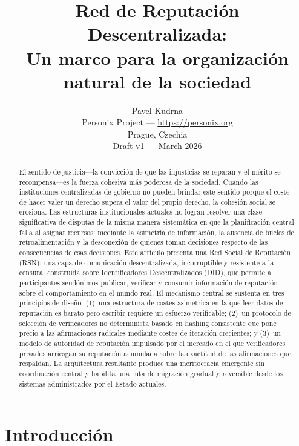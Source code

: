 \documentclass[11pt,a4paper,twocolumn]{article}
\title{\textbf{Red de Reputación Descentralizada:\\Un marco para la organización natural de la sociedad}}
\author{Pavel Kudrna\\Personix Project --- \url{https://personix.org}\\Prague, Czechia\\Draft v1 --- March 2026}
\date{}
\begin{document}
\maketitle

\begin{abstract}
El sentido de justicia---la convicción de que las injusticias se reparan y el mérito se recompensa---es la fuerza cohesiva más poderosa de la sociedad. Cuando las instituciones centralizadas de gobierno no pueden brindar este sentido porque el coste de hacer valer un derecho supera el valor del propio derecho, la cohesión social se erosiona. Las estructuras institucionales actuales no logran resolver una clase significativa de disputas de la misma manera sistemática en que la planificación central falla al asignar recursos: mediante la asimetría de información, la ausencia de bucles de retroalimentación y la desconexión de quienes toman decisiones respecto de las consecuencias de esas decisiones. Este artículo presenta una Red Social de Reputación (RSN): una capa de comunicación descentralizada, incorruptible y resistente a la censura, construida sobre Identificadores Descentralizados (DID), que permite a participantes seudónimos publicar, verificar y consumir información de reputación sobre el comportamiento en el mundo real. El mecanismo central se sustenta en tres principios de diseño: (1)~una estructura de costes asimétrica en la que leer datos de reputación es barato pero escribir requiere un esfuerzo verificable; (2)~un protocolo de selección de verificadores no determinista basado en hashing consistente que pone precio a las afirmaciones radicales mediante costes de iteración crecientes; y (3)~un modelo de autoridad de reputación impulsado por el mercado en el que verificadores privados arriesgan su reputación acumulada sobre la exactitud de las afirmaciones que respaldan. La arquitectura resultante produce una meritocracia emergente sin coordinación central y habilita una ruta de migración gradual y reversible desde los sistemas administrados por el Estado actuales.
\end{abstract}

\section{Introducción}
\end{document}
